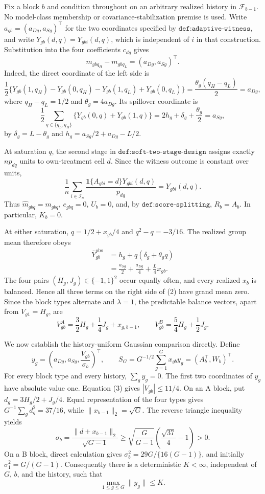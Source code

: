 Fix a block \(b\) and condition throughout on an arbitrary realized history in \(\mathcal F_{b-1}\).  No model-class membership or covariance-stabilization premise is used.  Write \(a_{gb}=(a_{Dg},a_{Sg})^\top\) for the two coordinates specified by \(\texttt{def:adaptive-witness}\), and write \(Y_{gb}(d,q)=Y_{gbi}(d,q)\), which is independent of \(i\) in that construction.  Substitution into the four coefficients \(c_{dq}\) gives
\[
m_{gbq_H}-m_{gbq_L}=(a_{Dg},a_{Sg})^\top.                 \tag{1}
\]
Indeed, the direct coordinate of the left side is
\[
\frac12\{Y_{gb}(1,q_H)-Y_{gb}(0,q_H)
             -Y_{gb}(1,q_L)+Y_{gb}(0,q_L)\}
=\frac{\theta_g(q_H-q_L)}2=a_{Dg},
\]
where \(q_H-q_L=1/2\) and \(\theta_g=4a_{Dg}\).  Its spillover coordinate is
\[
\frac12\sum_{q\in\{q_L,q_H\}}\{Y_{gb}(0,q)+Y_{gb}(1,q)\}
=2h_g+\delta_g+\frac{\theta_g}{2}=a_{Sg},
\]
by \(\delta_g=L-\theta_g\) and \(h_g=a_{Sg}/2+a_{Dg}-L/2\).

At saturation \(q\), the second stage in \(\texttt{def:soft-two-stage-design}\) assigns exactly \(np_{dq}\) units to own-treatment cell \(d\).  Since the witness outcome is constant over units,
\[
\frac1n\sum_{i\in\mathcal I_n}
 \frac{\mathbf 1\{A_{gbi}=d\}Y_{gbi}(d,q)}{p_{dq}}
=Y_{gbi}(d,q).
\]
Thus \(\widehat m_{gbq}=m_{gbq}\), \(e_{gbq}=0\), \(U_b=0\), and, by \(\texttt{def:score-splitting}\), \(R_b=A_b\).  In particular, \(K_b=0\).

At either saturation, \(q=1/2+x_{gb}/4\) and \(q^2-q=-3/16\).  The realized group mean therefore obeys
\[
\begin{aligned}
\bar Y^{\mathrm{obs}}_{gb}
&=h_g+q(\delta_g+\theta_gq)\\
&=\frac{a_{Sg}}2+\frac{a_{Dg}}4+\frac L4x_{gb}.
\end{aligned}                                               \tag{2}
\]
The four pairs \((H_g,J_g)\in\{-1,1\}^2\) occur equally often, and every realized \(x_b\) is balanced.  Hence all three terms on the right side of (2) have grand mean zero.  Since the block types alternate and \(\lambda=1\), the predictable balance vectors, apart from \(V_{g1}=H_g\), are
\[
V_{gb}^{A}=\frac32H_g+\frac14J_g+x_{g,b-1},
\qquad
V_{gb}^{B}=\frac54H_g+\frac12J_g.                        \tag{3}
\]

We now establish the history-uniform Gaussian comparison directly.  Define
\[
y_g=\left(a_{Dg},a_{Sg},\frac{V_{gb}}{\sigma_b}\right)^\top,
\qquad
S_G=G^{-1/2}\sum_{g=1}^Gx_{gb}y_g=(A_b^\top,W_b)^\top.
\]
For every block type and every history, \(\sum_gy_g=0\).  The first two coordinates of \(y_g\) have absolute value one.  Equation (3) gives \(|V_{gb}|\leq11/4\).  On an A block, put \(d_g=3H_g/2+J_g/4\).  Equal representation of the four types gives \(G^{-1}\sum_gd_g^2=37/16\), while \(\|x_{b-1}\|_2=\sqrt G\).  The reverse triangle inequality yields
\[
\sigma_b=\frac{\|d+x_{b-1}\|_2}{\sqrt{G-1}}
\geq\sqrt{\frac G{G-1}}\left(\frac{\sqrt{37}}4-1\right)>0. \tag{4}
\]
On a B block, direct calculation gives \(\sigma_b^2=29G/\{16(G-1)\}\), and initially \(\sigma_1^2=G/(G-1)\).  Consequently there is a deterministic \(K<\infty\), independent of \(G\), \(b\), and the history, such that
\[
\max_{1\leq g\leq G}\|y_g\|\leq K.                     \tag{5}
\]

